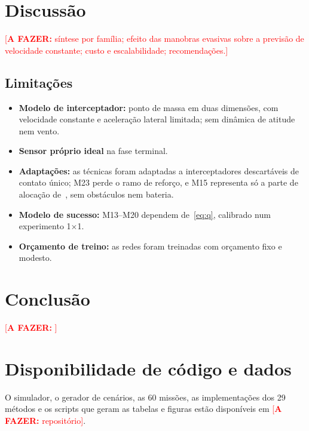 \documentclass[11pt,a4paper]{article}
\newcommand{\todo}[1]{\textcolor{red}{[\textbf{A FAZER:} #1]}}
\begin{document}
\section{Discussão}\label{sec:discussao}
\todo{síntese por família; efeito das manobras evasivas sobre a previsão de velocidade constante; custo e escalabilidade;
recomendações.}

\subsection{Limitações}
\begin{itemize}
  \item \textbf{Modelo de interceptador:} ponto de massa em duas dimensões, com velocidade constante e aceleração lateral
        limitada; sem dinâmica de atitude nem vento.
  \item \textbf{Sensor próprio ideal} na fase terminal.
  \item \textbf{Adaptações:} as técnicas foram adaptadas a interceptadores descartáveis de contato único; M23 perde o
        ramo de reforço, e M15 representa só a parte de alocação de~\cite{cruz2025}, sem obstáculos nem bateria.
  \item \textbf{Modelo de sucesso:} M13--M20 dependem de~\eqref{eq:q}, calibrado num experimento 1$\times$1.
  \item \textbf{Orçamento de treino:} as redes foram treinadas com orçamento fixo e modesto.
\end{itemize}

\section{Conclusão}
\todo{}

\section*{Disponibilidade de código e dados}
O simulador, o gerador de cenários, as 60 missões, as implementações dos 29 métodos e os scripts que geram as tabelas e
figuras estão disponíveis em \todo{repositório}.



\end{document}
